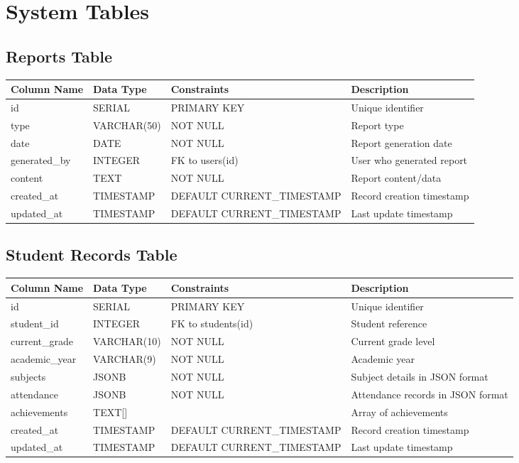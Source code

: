 \documentclass[11pt,a4paper]{article}
\begin{document}
\section{System Tables}

\subsection{Reports Table}
\begin{longtable}{|p{3cm}|p{3cm}|p{2cm}|p{6cm}|}
\hline
\textbf{Column Name} & \textbf{Data Type} & \textbf{Constraints} & \textbf{Description} \\
\hline
\endhead
id & SERIAL & PRIMARY KEY & Unique identifier \\
\hline
type & VARCHAR(50) & NOT NULL & Report type \\
\hline
date & DATE & NOT NULL & Report generation date \\
\hline
generated\_by & INTEGER & FK to users(id) & User who generated report \\
\hline
content & TEXT & NOT NULL & Report content/data \\
\hline
created\_at & TIMESTAMP & DEFAULT CURRENT\_TIMESTAMP & Record creation timestamp \\
\hline
updated\_at & TIMESTAMP & DEFAULT CURRENT\_TIMESTAMP & Last update timestamp \\
\hline
\end{longtable}

\subsection{Student Records Table}
\begin{longtable}{|p{3cm}|p{3cm}|p{2cm}|p{6cm}|}
\hline
\textbf{Column Name} & \textbf{Data Type} & \textbf{Constraints} & \textbf{Description} \\
\hline
\endhead
id & SERIAL & PRIMARY KEY & Unique identifier \\
\hline
student\_id & INTEGER & FK to students(id) & Student reference \\
\hline
current\_grade & VARCHAR(10) & NOT NULL & Current grade level \\
\hline
academic\_year & VARCHAR(9) & NOT NULL & Academic year \\
\hline
subjects & JSONB & NOT NULL & Subject details in JSON format \\
\hline
attendance & JSONB & NOT NULL & Attendance records in JSON format \\
\hline
achievements & TEXT[] & & Array of achievements \\
\hline
created\_at & TIMESTAMP & DEFAULT CURRENT\_TIMESTAMP & Record creation timestamp \\
\hline
updated\_at & TIMESTAMP & DEFAULT CURRENT\_TIMESTAMP & Last update timestamp \\
\hline
\end{longtable}
\end{document}
